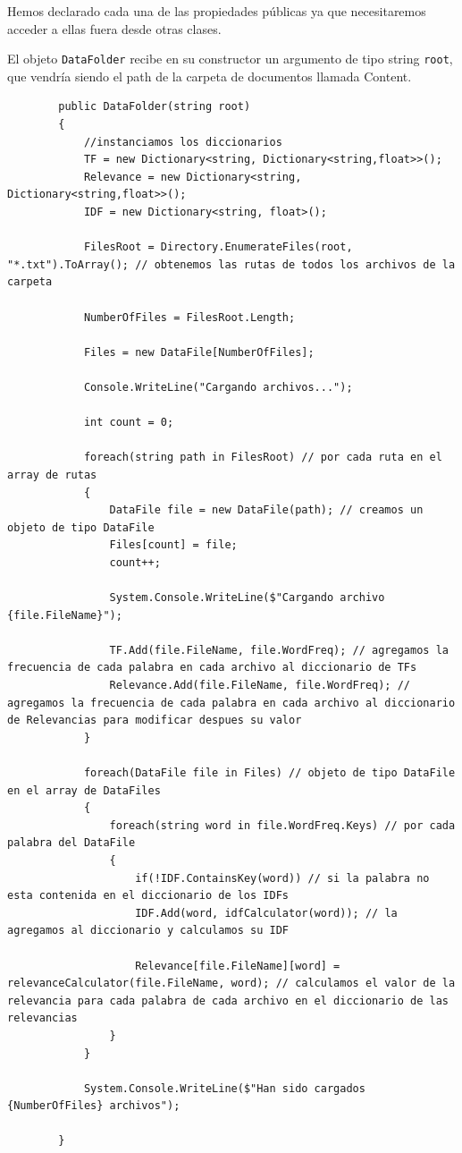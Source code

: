 \documentclass[12pt,a4paper]{report}
\begin{document}
Hemos declarado cada una de las propiedades públicas ya que necesitaremos acceder a ellas fuera desde otras clases.\par\bigskip
El objeto \texttt{DataFolder} recibe en su constructor un argumento de tipo string \texttt{root}, que vendría siendo el path de la carpeta de documentos llamada Content.

\begin{lstlisting}
        public DataFolder(string root)
        {   
            //instanciamos los diccionarios
            TF = new Dictionary<string, Dictionary<string,float>>(); 
            Relevance = new Dictionary<string, Dictionary<string,float>>();
            IDF = new Dictionary<string, float>();

            FilesRoot = Directory.EnumerateFiles(root, "*.txt").ToArray(); // obtenemos las rutas de todos los archivos de la carpeta
            
            NumberOfFiles = FilesRoot.Length;

            Files = new DataFile[NumberOfFiles];

            Console.WriteLine("Cargando archivos...");

            int count = 0;

            foreach(string path in FilesRoot) // por cada ruta en el array de rutas
            {
                DataFile file = new DataFile(path); // creamos un objeto de tipo DataFile
                Files[count] = file;
                count++;

                System.Console.WriteLine($"Cargando archivo {file.FileName}");

                TF.Add(file.FileName, file.WordFreq); // agregamos la frecuencia de cada palabra en cada archivo al diccionario de TFs
                Relevance.Add(file.FileName, file.WordFreq); // agregamos la frecuencia de cada palabra en cada archivo al diccionario de Relevancias para modificar despues su valor
            }

            foreach(DataFile file in Files) // objeto de tipo DataFile en el array de DataFiles
            {
                foreach(string word in file.WordFreq.Keys) // por cada palabra del DataFile
                {
                    if(!IDF.ContainsKey(word)) // si la palabra no esta contenida en el diccionario de los IDFs
                    IDF.Add(word, idfCalculator(word)); // la agregamos al diccionario y calculamos su IDF

                    Relevance[file.FileName][word] = relevanceCalculator(file.FileName, word); // calculamos el valor de la relevancia para cada palabra de cada archivo en el diccionario de las relevancias
                }
            }

            System.Console.WriteLine($"Han sido cargados {NumberOfFiles} archivos");

        }

\end{lstlisting}
\end{document}
